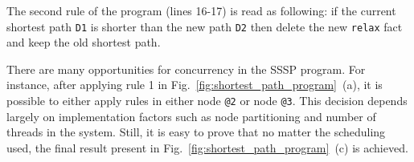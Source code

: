 The second rule of the program (lines 16-17) is read as following: if the
current shortest path \texttt{D1} is shorter than the new path \texttt{D2} then
delete the new \texttt{relax} fact and keep the old shortest path.

There are many opportunities for concurrency in the SSSP program. For instance,
after applying rule 1 in Fig.~\ref{fig:shortest_path_program}~(a), it is
possible to either apply rules in either node \texttt{@2} or node
\texttt{@3}. This decision depends largely on implementation factors such as node
partitioning and number of threads in the system.
Still, it is easy to prove that no matter the scheduling used,
the final result present in Fig.~\ref{fig:shortest_path_program}~(c) is achieved.

